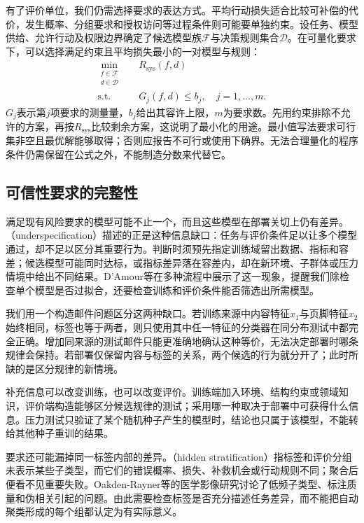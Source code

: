 有了评价单位，我们仍需选择要求的表达方式。平均行动损失适合比较可补偿的代价，发生概率、分组要求和授权访问等过程条件则可能要单独约束。设任务、模型供给、允许行动及权限边界确定了候选模型族$\mathcal F$与决策规则集合$\mathcal D$。在可量化要求下，可以选择满足约束且平均损失最小的一对模型与规则：
\begin{equation}
 \begin{aligned}
  \min_{\substack{f\in\mathcal F\\d\in\mathcal D}}\quad
  &R_{\mathrm{sys}}(f,d)\\
  \text{s.t.}\quad
  &G_j(f,d)\leq b_j,\quad j=1,\ldots,m.
 \end{aligned}
 \label{eq:trust-constrained-objective}
\end{equation}
$G_j$表示第$j$项要求的测量量，$b_j$给出其容许上限，$m$为要求数。先用约束排除不允许的方案，再按$R_{\mathrm{sys}}$比较剩余方案，这说明了最小化的用途。最小值写法要求可行集非空且最优解能够取得；否则应报告不可行或使用下确界。无法合理量化的程序条件仍需保留在公式之外，不能制造分数来代替它。

\subsection{可信性要求的完整性}

满足现有风险要求的模型可能不止一个，而且这些模型在部署关切上仍有差异。（underspecification）描述的正是这种信息缺口：任务与评价条件足以让多个模型通过，却不足以区分其重要行为。判断时须预先指定训练域留出数据、指标和容差；候选模型可能同时达标，或指标差异落在容差内，却在新环境、子群体或压力情境中给出不同结果。D'Amour等在多种流程中展示了这一现象，提醒我们除检查单个模型是否过拟合，还要检查训练和评价条件能否筛选出所需模型。

我们用一个构造邮件问题区分这两种缺口。若训练来源中内容特征$x_1$与页脚特征$x_2$始终相同，标签也等于两者，则只使用其中任一特征的分类器在同分布测试中都完全正确。增加同来源的测试邮件只能更准确地确认这种等价，无法决定部署时哪条规律会保持。若部署仅保留内容与标签的关系，两个候选的行为就分开了；此时所缺的是区分规律的新情境。

补充信息可以改变训练，也可以改变评价。训练端加入环境、结构约束或领域知识，评价端构造能够区分候选规律的测试；采用哪一种取决于部署中可获得什么信息。压力测试只验证了某个随机种子产生的模型时，结论也只属于该模型，不能转给其他种子重训的结果。

要求还可能漏掉同一标签内部的差异。（hidden stratification）指标签和评价分组未表示某些子类型，而它们的错误概率、损失、补救机会或行动规则不同；聚合后便看不见重要失败。Oakden-Rayner等的医学影像研究讨论了低频子类型、标注质量和伪相关引起的问题。由此需要检查标签是否充分描述任务差异，而不能把自动聚类形成的每个组都认定为有实际意义。

